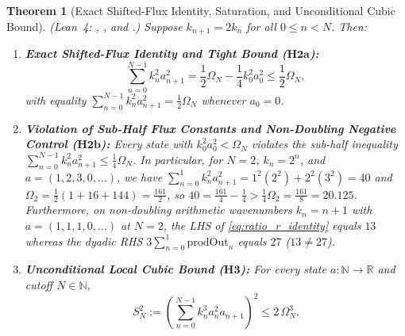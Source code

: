 \documentclass[11pt,a4paper]{article}
\newtheorem{theorem}{Theorem}[section]
\theoremstyle{definition}
\theoremstyle{remark}
\begin{document}
\begin{theorem}[Exact Shifted-Flux Identity, Saturation, and Unconditional Cubic Bound]\label{thm:cubic_bound}
\emph{(Lean~4: , , and .)} Suppose $k_{n+1} = 2 k_n$ for all $0 \le n < N$. Then:
\begin{enumerate}
\item \textbf{Exact Shifted-Flux Identity and Tight Bound ($\mathbf{H2a}$):}
\begin{equation}\label{eq:shifted_flux_id}
\sum_{n=0}^{N-1} k_n^2 a_{n+1}^2 = \frac{1}{2}\Omega_N - \frac{1}{4}k_0^2 a_0^2 \le \frac{1}{2}\Omega_N,
\end{equation}
with equality $\sum_{n=0}^{N-1} k_n^2 a_{n+1}^2 = \frac{1}{2}\Omega_N$ whenever $a_0 = 0$.
\item \textbf{Violation of Sub-Half Flux Constants and Non-Doubling Negative Control ($\mathbf{H2b}$):} Every state with $k_0^2 a_0^2 < \Omega_N$ violates the sub-half inequality $\sum_{n=0}^{N-1} k_n^2 a_{n+1}^2 \le \frac{1}{4}\Omega_N$. In particular, for $N=2$, $k_n = 2^n$, and $a = (1, 2, 3, 0, \dots)$, we have $\sum_{n=0}^1 k_n^2 a_{n+1}^2 = 1^2(2^2) + 2^2(3^2) = 40$ and $\Omega_2 = \frac{1}{2}(1 + 16 + 144) = \frac{161}{2}$, so $40 = \frac{161}{4} - \frac{1}{4} > \frac{1}{4}\Omega_2 = \frac{161}{8} = 20.125$. Furthermore, on non-doubling arithmetic wavenumbers $k_n = n+1$ with $a=(1,1,1,0,\dots)$ at $N=2$, the LHS of \eqref{eq:ratio_r_identity} equals $13$ whereas the dyadic RHS $3 \sum_{n=0}^1 \mathrm{prodOut}_n$ equals $27$ ($13 \ne 27$).
\item \textbf{Unconditional Local Cubic Bound ($\mathbf{H3}$):} For every state $a : \mathbb{N} \to \mathbb{R}$ and cutoff $N \in \mathbb{N}$,
\begin{equation}\label{eq:local_cubic}
S_N^2 := \left(\sum_{n=0}^{N-1} k_n^3 a_n^2 a_{n+1}\right)^2 \le 2\,\Omega_N^3.
\end{equation}
\end{enumerate}
\end{theorem}
\end{document}
